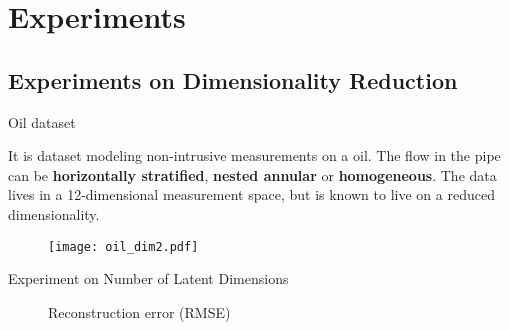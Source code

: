 \newlength\figureheight
\newlength\figurewidth

\section{Experiments}

\subsection{Experiments on Dimensionality Reduction}
\begin{frame}{Oil dataset}
    \begin{minipage}{.48\textwidth}
        It is dataset modeling non-intrusive measurements on a oil. The flow in the pipe can be \textbf{horizontally stratified}, \textbf{nested annular} or \textbf{homogeneous}. The data lives in a 12-dimensional measurement space, but is known to live on a reduced dimensionality.
    \end{minipage}
    \begin{minipage}{.48\textwidth}
        \begin{figure}
            \texttt{[image: oil\_dim2.pdf]}
        \end{figure}
    \end{minipage}
\end{frame}

%    
%
%    



\begin{frame}{Experiment on Number of Latent Dimensions}
    \setlength\figureheight{.9\textheight}
    \setlength\figurewidth{\textwidth}
    \begin{figure}
        
        \caption{Reconstruction error (RMSE)}
    \end{figure}
\end{frame}

